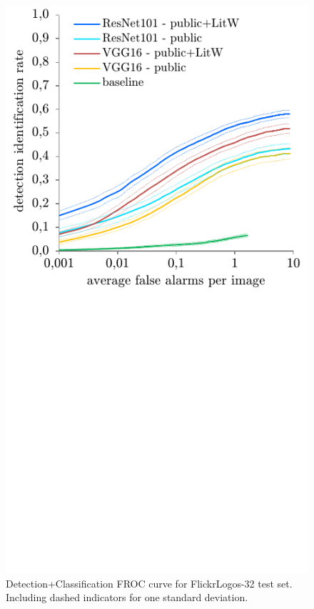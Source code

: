 \documentclass[a4paper,twoside]{article}
\begin{document}
\begin{figure}%
\centering%
\includegraphics[width=\linewidth, trim=0cm 7cm 0cm 0cm, clip]{img/classificationFroc.pdf}%
\caption{Detection+Classification FROC curve for FlickrLogos-32 test set. Including dashed indicators for one standard deviation.}%
\label{fig:classificationFroc}
\end{figure}%
%
\end{document}
